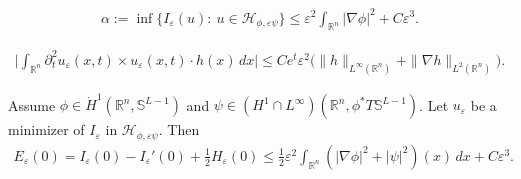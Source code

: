 \documentclass[10pt,a4paper]{amsart}
\newcommand{\eps}{\varepsilon}
\begin{document}
\begin{align}\label{energy_ineq1}
\alpha:=\inf\Big\{I_\eps(u):\  u\in \mathcal{H}_{\phi,\eps\psi}\Big\}
\le \eps^2\int_{\mathbb{R}^n}
|\nabla\phi|^2+C\eps^3.  
\end{align}

\begin{align}\label{dual_est}
 \Big|\int_{\mathbb{R}^n} 
 \partial_t^2u_\eps(x,t)\times u_\eps(x,t)\cdot h(x)\,dx\Big|\le Ce^{t}\eps^2\Big(\|h\|_{L^\infty(\mathbb {R}^n)}+\|\nabla h\|_{L^2(\mathbb{R}^n)}\Big).
\end{align}    

\begin{lemma} \label{sharp_est0} Assume $\phi\in \dot{H}^1(\mathbb R^n,\mathbb S^{L-1})$ 
and $\psi\in ({H}^1\cap L^\infty)(\mathbb R^n,\mathbb \phi^*T\mathbb{S}^{L-1})$.
Let $u_\eps$ be a minimizer of $I_\eps$ in $\mathcal{H}_{\phi,\eps\psi}$.  Then
\begin{align}\label{sharp_est}
 E_\eps(0)
 =I_\eps(0)-I_\eps'(0)+\frac12 H_\eps(0)\le
 \frac12\eps^2\int_{\mathbb{R}^n}
 (|\nabla\phi|^2+|\psi|^2)(x)\,dx+C\eps^3.
\end{align}
    
\end{lemma}
\end{document}
